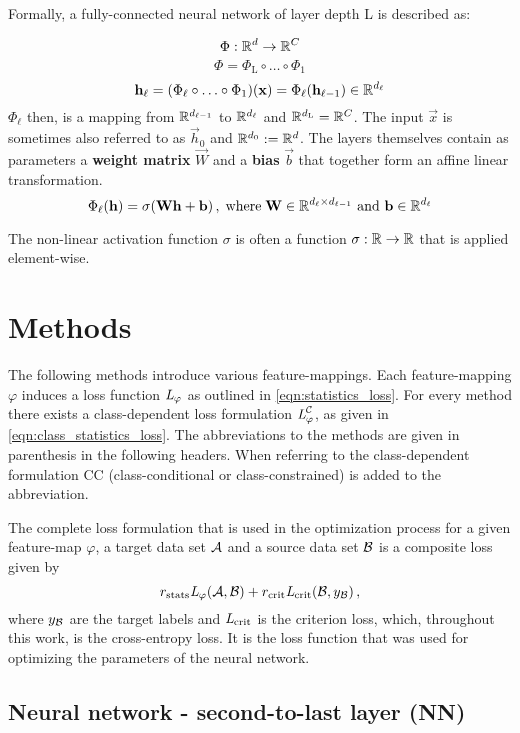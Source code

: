 Formally, a fully-connected neural network of layer depth L is described as:

\[
    \Phi : \mathbb{R}^d \to \mathbb{R}^C
\]
\[
    \Phi = \Phi_\text{L} \circ \ldots \circ \Phi_1
\]
\[
    \mathbf h_\ell = (\Phi_\ell \circ \ldots \circ \Phi_1) (\mathbf x) =
    \Phi_\ell(\mathbf h_{\ell-1}) \in \mathbb{R}^{d_\ell}
\]
$\Phi_\ell$ then, is a mapping from $\mathbb{R}^{d_{\ell-1}}$ to $\mathbb{R}^{d_\ell}$ and $\mathbb{R}^{d_\textnormal{L}} = \mathbb{R}^C$.
The input $\vec x$ is sometimes also referred to as $\vec h_0$ and $\mathbb{R}^{d_0} := \mathbb{R}^d$.
The layers themselves contain as parameters a \textbf{weight matrix} $\vec W$ and a \textbf{bias} $\vec b$
that together form an affine linear transformation.
\[
    \Phi_\ell(\mathbf h) = \sigma (\mathbf W \mathbf h + \mathbf b) \,, \; \text{where} \;
    \mathbf W \in \mathbb{R}^{d_\ell \times d_{\ell-1}} \text{ and } 
    \mathbf b \in \mathbb{R}^{d_\ell}
\]

The non-linear activation function $\sigma$ is often a function $\sigma:\mathbb{R}\to\mathbb{R}$ that is applied element-wise.



\section{Methods}
\label{sec:methods}

The following methods introduce various feature-mappings.
Each feature-mapping $\varphi$ induces a loss function $\textit{L}_\varphi$ as outlined in \cref{eqn:statistics_loss}.
For every method there exists a class-dependent loss formulation $\textit{L}_\varphi^{\mathcal C}$,
as given in \cref{eqn:class_statistics_loss}.
The abbreviations to the methods are given in parenthesis in the following headers. 
When referring to the class-dependent formulation CC (class-conditional or
class-constrained) is added to the abbreviation.

The complete loss formulation that is used in the optimization process 
for a given feature-map $\varphi$, a target data set $\mathcal A$ and a source data set $\mathcal B$ 
is a composite loss given by
\[
    r_\text{stats}\textit{L}_\varphi(\mathcal A, \mathcal B) + r_\text{crit}\textit{L}_\text{crit}(\mathcal B, y_{\mathcal B}) \,,
\]
where $y_{\mathcal B}$ are the target labels and $\textit{L}_\text{crit}$ is the criterion loss, which, throughout this work, is the cross-entropy loss.
It is the loss function that was used for optimizing the parameters of the neural network.



\subsection{Neural network - second-to-last layer (NN)}

